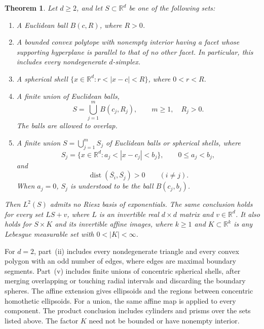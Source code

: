 \documentclass[10pt,a4paper]{amsart}
\newtheorem{theorem}{Theorem}[section]
\def\R{\mathbb{R}}
\newcommand\1{\mathbbm{1}}
\begin{document}
\begin{theorem}\label{thm:main}
Let $d\ge2$, and let $S\subset\R^d$ be one of the following sets:
\begin{enumerate}
    \item[(i)] A Euclidean ball $B(c,R)$, where $R>0$.

    \item[(ii)] A bounded convex polytope with nonempty interior having a facet
    whose supporting hyperplane is parallel to that of no other facet.
    In particular, this includes every nondegenerate $d$-simplex.

    \item[(iii)] A spherical shell $\{x\in\R^d:r<|x-c|<R\}$,
    where $0<r<R$.

    \item[(iv)] A finite union of Euclidean balls,
    \begin{equation*}
        S=\bigcup_{j=1}^{m}B(c_j,R_j),
        \qquad m\ge1,\quad R_j>0.
    \end{equation*}
    The balls are allowed to overlap.

    \item[(v)] A finite union $S=\bigcup_{j=1}^{m}S_j$ of Euclidean balls or
    spherical shells, where
    \begin{equation*}
        S_j=\{x\in\R^d:a_j<|x-c_j|<b_j\},
        \qquad 0\le a_j<b_j,
    \end{equation*}
    and
    \begin{equation*}
        \operatorname{dist}(\overline{S_i},\overline{S_j})>0
        \qquad (i\ne j).
    \end{equation*}
    When $a_j=0$, $S_j$ is understood to be the ball $B(c_j,b_j)$.
\end{enumerate}
Then $L^2(S)$ admits no Riesz basis of exponentials. The same conclusion holds
for every set $LS+v$, where $L$ is an invertible real $d\times d$ matrix and
$v\in\R^d$. It also holds for $S\times K$ and its invertible affine images,
where $k\ge1$ and $K\subset\R^k$ is any Lebesgue measurable set with
$0<|K|<\infty$.
\end{theorem}

For $d=2$, part~(ii) includes every nondegenerate triangle and every convex
polygon with an odd number of edges, where edges are maximal boundary segments.
Part~(v) includes finite unions of concentric spherical shells, after merging
overlapping or touching radial intervals and discarding the boundary spheres.
The affine extension gives ellipsoids and the regions between concentric
homothetic ellipsoids. For a union, the same affine map is applied to every component.
The product conclusion includes cylinders and prisms over the sets listed above.
The factor $K$ need not be bounded or have nonempty interior.
\end{document}
